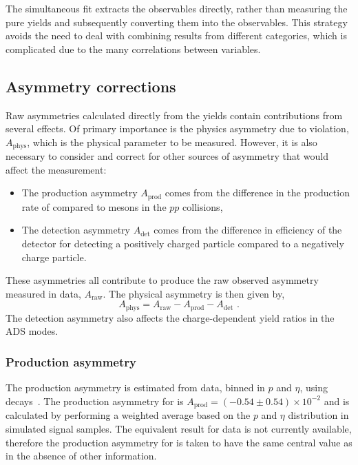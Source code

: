 The simultaneous fit extracts the \CP observables directly, rather than measuring the pure yields and subsequently converting them into the \CP observables. This strategy avoids the need to deal with combining results from different categories, which is complicated due to the many correlations between variables. 

\subsection{Asymmetry corrections}
\label{sec:cpfit:asymmetries}

Raw asymmetries calculated directly from the yields contain contributions from several effects. Of primary importance is the physics asymmetry due to \CP violation, $A_{\text{phys}}$, which is the physical parameter to be measured. However, it is also necessary to consider and correct for other sources of asymmetry that would affect the measurement:
\begin{itemize}
\item The production asymmetry $A_{\text{prod}}$ comes from the difference in the production rate of \Bp compared to \Bm mesons in the $pp$ collisions,
\item The detection asymmetry $A_{\text{det}}$ comes from the difference in efficiency of the detector for detecting a positively charged particle compared to a negatively charge particle.
\end{itemize}
These asymmetries all contribute to produce the raw observed asymmetry measured in data, $A_{\text{raw}}$. The physical asymmetry is then given by,
\begin{equation}
A_{\text{phys}} = A_{\text{raw}} - A_{\text{prod}} - A_{\text{det}} \text{ .}
\label{asymmetries}
\end{equation} 
The detection asymmetry also affects the charge-dependent yield ratios in the ADS modes. 

\subsubsection{Production asymmetry}

The \Bpm production asymmetry is estimated from \lhcb \runone data, binned in $p$ and $\eta$, using \decay{\Bp}{\Dzb\pip} decays~\cite{LHCb-PAPER-2016-054}. The production asymmetry for \btodkst is $A_{\text{prod}} = (-0.54 \pm 0.54) \times 10^{-2}$ and is calculated by performing a weighted average based on the $p$ and $\eta$ distribution in simulated signal samples. The equivalent result for \runtwo data is not currently available, therefore the production asymmetry for \runtwo is taken to have the same central value as \runone in the absence of other information. 

